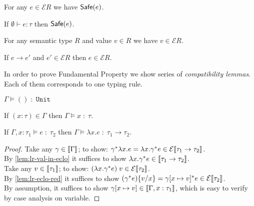 \begin{theorem}[Adequacy]
  For any $e \in \mathcal{E}R$ we have $\mathsf{Safe}(e)$.
\end{theorem}

\begin{theorem}
  If $\emptyset \vdash e : \tau$ then $\mathsf{Safe}(e)$.
\end{theorem}

\begin{lemma}\label{lem:lr-val-in-eclo}
  For any semantic type $R$ and value $v \in R$
  we have $v \in \mathcal{E}R$.
\end{lemma}

\begin{lemma}\label{lem:lr-eclo-red}
  If $e \longrightarrow e'$ and $e' \in \mathcal{E}R$ then $e \in \mathcal{E}R$.
\end{lemma}

In order to prove Fundamental Property
we show series of \emph{compatibility lemmas}.
Each of them corresponds to one typing rule.

\begin{lemma}
  $\Gamma \models () \;:\; \mathtt{Unit}$
\end{lemma}

\begin{lemma}
  If $(x:\tau) \in \Gamma$ then
  $\Gamma \models x \;:\; \tau$.
\end{lemma}

\begin{lemma}
  If $\Gamma, x:\tau_1 \models e \;:\; \tau_2$
  then $\Gamma \models \lambda x.e \;:\; \tau_1 \to \tau_2$.
\end{lemma}
\begin{proof}
  Take any $\gamma \in \llbracket\Gamma\rrbracket$;
    to show: $\gamma^{*}\lambda x.e
      = \lambda x.\gamma^{*} e
      \in \mathcal{E}\llbracket\tau_1 \to \tau_2\rrbracket$.\\
  By \autoref{lem:lr-val-in-eclo} it suffices to show 
    $\lambda x.\gamma^{*} e
      \in \llbracket\tau_1 \to \tau_2\rrbracket$.\\
  Take any $v \in \llbracket\tau_1\rrbracket$;
    to show: $(\lambda x.\gamma^{*} e)\;v
      \in \mathcal{E}\llbracket\tau_2\rrbracket$. \\
  By \autoref{lem:lr-eclo-red} it suffices to show
    $(\gamma^{*} e)\{v/x\}
    = \gamma[x\mapsto v]^* e \in \mathcal{E}\llbracket\tau_2\rrbracket$. \\
  By assumption, it suffices to show
    $\gamma[x\mapsto v] \in \llbracket\Gamma, x : \tau_1\rrbracket$,
  which is easy to verify by case analysis on variable.
\end{proof}

